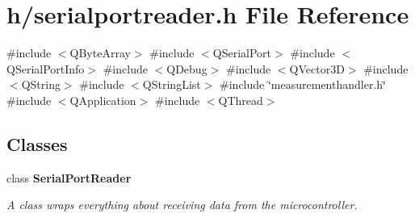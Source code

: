 \section{h/serialportreader.h File Reference}
\label{serialportreader_8h}
{\ttfamily \#include $<$Q\+Byte\+Array$>$}\newline
{\ttfamily \#include $<$Q\+Serial\+Port$>$}\newline
{\ttfamily \#include $<$Q\+Serial\+Port\+Info$>$}\newline
{\ttfamily \#include $<$Q\+Debug$>$}\newline
{\ttfamily \#include $<$Q\+Vector3D$>$}\newline
{\ttfamily \#include $<$Q\+String$>$}\newline
{\ttfamily \#include $<$Q\+String\+List$>$}\newline
{\ttfamily \#include \char`\"{}measurementhandler.\+h\char`\"{}}\newline
{\ttfamily \#include $<$Q\+Application$>$}\newline
{\ttfamily \#include $<$Q\+Thread$>$}\newline
\subsection*{Classes}
\begin{DoxyCompactItemize}
\item 
class \textbf{ Serial\+Port\+Reader}
\begin{DoxyCompactList}\small\item\em A class wraps everything about receiving data from the microcontroller. \end{DoxyCompactList}\end{DoxyCompactItemize}
